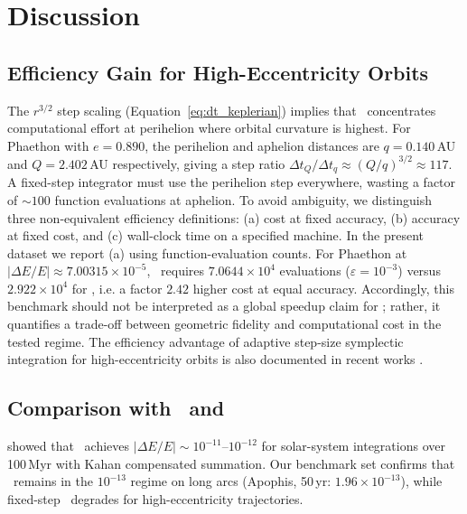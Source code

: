 
\section{Discussion}
\label{sec:discussion}

\subsection{Efficiency Gain for High-Eccentricity Orbits}
\label{sec:efficiency}

The $r^{3/2}$ step scaling (Equation~\ref{eq:dt_keplerian}) implies
that \AAS\ concentrates computational effort at perihelion where
orbital curvature is highest. For Phaethon with $e = 0.890$, the
perihelion and aphelion distances are $q = 0.140$\,AU and
$Q = 2.402$\,AU respectively, giving a step ratio
$\Delta t_Q / \Delta t_q \approx (Q/q)^{3/2} \approx 117$.
A fixed-step integrator must use the perihelion step everywhere,
wasting a factor of $\sim 100$ function evaluations at aphelion.
To avoid ambiguity, we distinguish three non-equivalent efficiency
definitions: (a) cost at fixed accuracy, (b) accuracy at fixed cost,
and (c) wall-clock time on a specified machine.
In the present dataset we report (a) using function-evaluation counts.
For Phaethon at $|\Delta E/E|\approx7.00315\times10^{-5}$,
\AAS\ requires $7.0644\times10^4$ evaluations
($\varepsilon=10^{-3}$) versus $2.922\times10^4$ for \saba,
i.e.
a factor $2.42$ higher cost at equal accuracy.
Accordingly, this benchmark should not be interpreted as a global
speedup claim for \AAS; rather, it quantifies a trade-off between
geometric fidelity and computational cost in the tested regime.
The efficiency advantage of adaptive step-size symplectic integration
for high-eccentricity orbits is also documented in recent works
\citep{Wang2024tts, Ye2025}.

\subsection{Comparison with \orbitn\ and \rebound}
\label{sec:comparison}

\citet{Zeebe2023} showed that \orbitn\ achieves
$|\Delta E/E| \sim 10^{-11}$--$10^{-12}$ for solar-system
integrations over 100\,Myr with Kahan compensated summation.
Our benchmark set confirms that \AAS\ remains in the
$10^{-13}$ regime on long arcs (Apophis, 50\,yr:
$1.96\times10^{-13}$), while fixed-step \saba\ degrades for
high-eccentricity trajectories.

